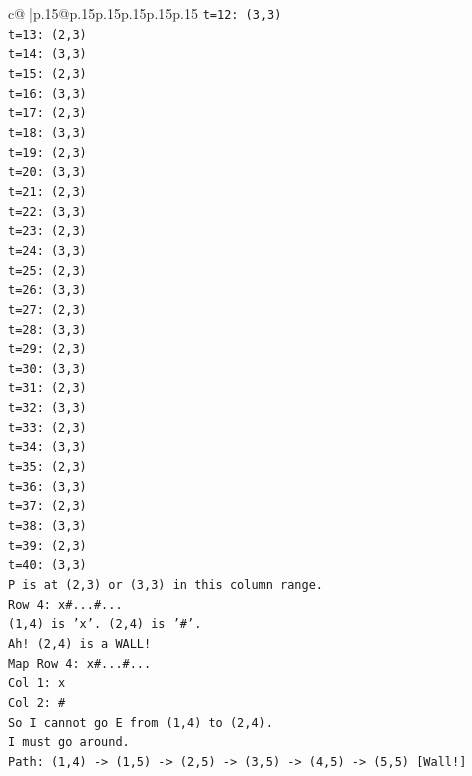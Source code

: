 \documentclass{article}
\begin{document}
{\begin{supertabular}{c@{$\;$}|p{.15\linewidth}@{}p{.15\linewidth}p{.15\linewidth}p{.15\linewidth}p{.15\linewidth}p{.15\linewidth}}
{{{\texttt{t=12: (3,3)} \\
\texttt{t=13: (2,3)} \\
\texttt{t=14: (3,3)} \\
\texttt{t=15: (2,3)} \\
\texttt{t=16: (3,3)} \\
\texttt{t=17: (2,3)} \\
\texttt{t=18: (3,3)} \\
\texttt{t=19: (2,3)} \\
\texttt{t=20: (3,3)} \\
\texttt{t=21: (2,3)} \\
\texttt{t=22: (3,3)} \\
\texttt{t=23: (2,3)} \\
\texttt{t=24: (3,3)} \\
\texttt{t=25: (2,3)} \\
\texttt{t=26: (3,3)} \\
\texttt{t=27: (2,3)} \\
\texttt{t=28: (3,3)} \\
\texttt{t=29: (2,3)} \\
\texttt{t=30: (3,3)} \\
\texttt{t=31: (2,3)} \\
\texttt{t=32: (3,3)} \\
\texttt{t=33: (2,3)} \\
\texttt{t=34: (3,3)} \\
\texttt{t=35: (2,3)} \\
\texttt{t=36: (3,3)} \\
\texttt{t=37: (2,3)} \\
\texttt{t=38: (3,3)} \\
\texttt{t=39: (2,3)} \\
\texttt{t=40: (3,3)} \\
\texttt{P is at (2,3) or (3,3) in this column range.} \\
\texttt{Row 4: x\#...\#...} \\
\texttt{(1,4) is 'x'. (2,4) is '\#'.} \\
\texttt{Ah! (2,4) is a WALL!} \\
\texttt{Map Row 4: x\#...\#...} \\
\texttt{Col 1: x} \\
\texttt{Col 2: \#} \\
\texttt{So I cannot go E from (1,4) to (2,4).} \\
\texttt{I must go around.} \\
\texttt{Path: (1,4) {-}> (1,5) {-}> (2,5) {-}> (3,5) {-}> (4,5) {-}> (5,5) {[}Wall!{]}} \\
}}}
\end{supertabular}}
\end{document}

